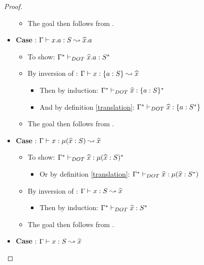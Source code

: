 \begin{proof}
\begin{itemize}
\begin{itemize}
\begin{itemize}
            \end{itemize}
            \item The goal then follows from .
        \end{itemize}
        \item \textbf{Case} : $\Gamma \vdash x.a: S \leadsto \widehat{x}.a$
        \begin{itemize}
            \item To show: $\Gamma^{*} \vdash_{DOT} \widehat{x}.a: S^{*}$
            \item By inversion of :
                $\Gamma \vdash x: \{a : S\} \leadsto \widehat{x}$
            \begin{itemize}
                \item Then by induction:
                    $\Gamma^{*} \vdash_{DOT} \widehat{x}: \{a : S\}^{*}$
                \item And by definition \ref{translation}:
                    $\Gamma^{*} \vdash_{DOT} \widehat{x}: \{a : S^{*}\}$
            \end{itemize}
            \item The goal then follows from .
        \end{itemize}
        \item \textbf{Case} :
            $\Gamma \vdash x: \mu(\widehat{x} : S) \leadsto \widehat{x}$
        \begin{itemize}
            \item To show:
                $\Gamma^{*} \vdash_{DOT} \widehat{x}: \mu(\widehat{x} : S)^{*}$
            \begin{itemize}
                \item Or by definition \ref{translation}:
                    $\Gamma^{*} \vdash_{DOT} \widehat{x}: \mu(\widehat{x} : S^{*})$
            \end{itemize}
            \item By inversion of : $\Gamma \vdash x: S \leadsto \widehat{x}$
            \begin{itemize}
                \item Then by induction:
                    $\Gamma^{*} \vdash_{DOT} \widehat{x}: S^{*}$
            \end{itemize}
            \item The goal then follows from .
        \end{itemize}
        \item \textbf{Case} : $\Gamma \vdash x: S \leadsto \widehat{x}$

\end{itemize}
\end{proof}
